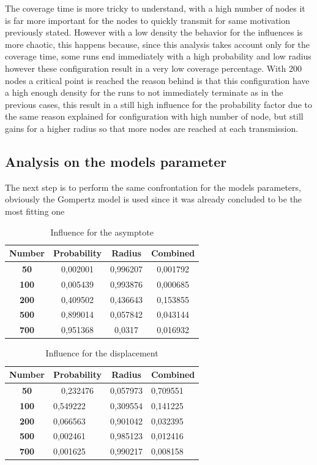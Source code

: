 The coverage time is more tricky to understand, with a high number of nodes it is far more important for the nodes to quickly transmit for same motivation previously stated. However with a low density the behavior for the influences is more chaotic, this happens because, since this analysis takes account only for the coverage time, some runs end immediately with a high probability and low radius however these configuration result in a very low coverage percentage. With 200 nodes a critical point is reached the reason behind is that this configuration have a high enough density for the runs to not immediately terminate as in the previous cases, this result in a still high influence for the probability factor due to the same reason explained for configuration with high number of node, but still gains for a higher radius so that more nodes are reached at each transmission.

\subsection{Analysis on the models parameter}
The next step is to perform the same confrontation for the models parameters, obviously the Gompertz model is used since it was already concluded to be the most fitting one

\begin{table}[H]
\centering
\begin{tabular}{|c|c|c|c|}
\hline
\textbf{Number} & \textbf{Probability} & \textbf{Radius} & \textbf{Combined} \\ \hline
\textbf{50} & 0,002001 & 0,996207 & 0,001792 \\ \hline
\textbf{100} & 0,005439 & 0,993876 & 0,000685 \\ \hline
\textbf{200} & 0,409502 & 0,436643 & 0,153855 \\ \hline
\textbf{500} & 0,899014 & 0,057842 & 0,043144 \\ \hline
\textbf{700} & 0,951368 & 0,0317 & 0,016932 \\ \hline
\end{tabular}
\caption{Influence for the asymptote}
\end{table} 


\begin{table}[H]
\centering
\begin{tabular}{|c|l|l|l|}
\hline
\textbf{Number} & \multicolumn{1}{c|}{\textbf{Probability}} & \multicolumn{1}{c|}{\textbf{Radius}} & \multicolumn{1}{c|}{\textbf{Combined}} \\ \hline
\textbf{50} & \multicolumn{1}{c|}{0,232476} & 0,057973 & 0,709551 \\ \hline
\textbf{100} & 0,549222 & 0,309554 & 0,141225 \\ \hline
\textbf{200} & 0,066563 & 0,901042 & 0,032395 \\ \hline
\textbf{500} & 0,002461 & 0,985123 & 0,012416 \\ \hline
\textbf{700} & 0,001625 & 0,990217 & 0,008158 \\ \hline
\end{tabular}
\caption{Influence for the displacement}
\end{table}


